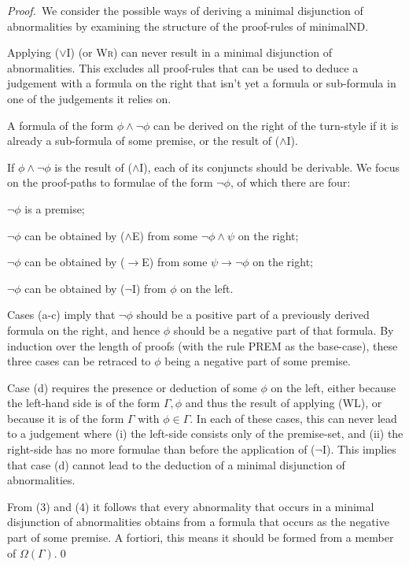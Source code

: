 \documentclass[]{article}
\begin{document}
\noindent\textsl{Proof.}~We consider the possible ways of deriving a minimal disjunction of abnormalities by examining the structure of the proof-rules of \textsf{minimalND}.
\begin{enumerate*}
    \item Applying ($\vee$I) (or \textsc{Wr}) can never result in a minimal disjunction of abnormalities. This excludes all proof-rules that can be used to deduce a judgement with a formula on the right that isn't yet a formula or sub-formula in one of the judgements it relies on.
    \item A formula of the form $\phi \wedge \neg \phi$ can be derived on the right of the turn-style if it is already a sub-formula of some premise, or the result of ($\wedge$I).
    \item If $\phi \wedge \neg \phi$ is the result of ($\wedge$I), each of its conjuncts should be derivable. We focus on the proof-paths to formulae of the form $\neg \phi$, of which there are four:
        \begin{enumerate*}
            \item $\neg \phi$ is a premise;
            \item $\neg \phi$ can be obtained by ($\wedge$E) from some $\neg \phi \wedge \psi$ on the right;
            \item $\neg \phi$ can be obtained by ($\to$E) from some $\psi \to \neg \phi$ on the right;
            \item $\neg \phi$ can be obtained by ($\neg$I) from $\phi$ on the left.
        \end{enumerate*}
        Cases (a-c) imply that $\neg \phi$ should be a positive part of a previously derived formula on the right, and hence $\phi$ should be a negative part of that formula. By induction over the length of proofs (with the rule {\sf PREM}  as the base-case), these three cases can be retraced to $\phi$ being a negative part of some premise.
    \item Case (d) requires the presence or deduction of some $\phi$ on the left, either because the left-hand side is of the form $\Gamma, \phi$ and thus the result of applying (\textsf{WL}), or because it is of the form $\Gamma$ with $\phi \in \Gamma$. In each of these cases, this can never lead to a judgement where (i) the left-side consists only of the premise-set, and (ii) the right-side has no more formulae than before the application of ($\neg$I). This implies that case (d) cannot lead to the deduction of a minimal disjunction of abnormalities.
\end{enumerate*}
From (3) and (4) it follows that every abnormality that occurs in a minimal disjunction of abnormalities obtains from a formula that occurs as the negative part of some premise. A fortiori, this means it should be formed from a member of $\Omega(\Gamma)$.\qed
\end{document}
